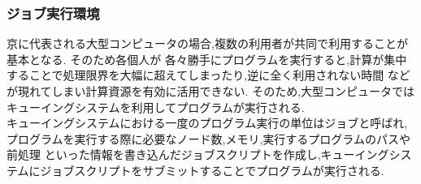 \subsubsection{ジョブ実行環境}
\label{subsec:job-env}
京に代表される大型コンピュータの場合,複数の利用者が共同で利用することが基本となる. そのため各個人が
各々勝手にプログラムを実行すると,計算が集中することで処理限界を大幅に超えてしまったり,逆に全く利用されない時間
などが現れてしまい計算資源を有効に活用できない. そのため,大型コンピュータではキューイングシステムを利用してプログラムが実行される.\\
キューイングシステムにおける一度のプログラム実行の単位はジョブと呼ばれ,プログラムを実行する際に必要なノード数,メモリ,実行するプログラムのパスや前処理
といった情報を書き込んだジョブスクリプトを作成し,キューイングシステムにジョブスクリプトをサブミットすることでプログラムが実行される.\\


